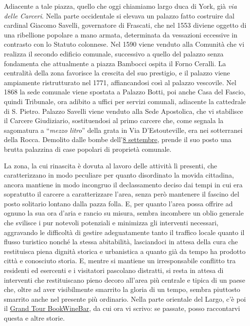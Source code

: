\documentclass[
  letterpaper,
  DIV=11,
  numbers=noendperiod]{scrartcl}
\begin{document}
Adiacente a tale piazza, quello che oggi chiamiamo largo duca di York,
già \emph{via delle Carceri}. Nella parte occidentale si elevava un
palazzo fatto costruire dal cardinal Giacomo Savelli, governatore di
Frascati, che nel 1553 diviene oggetto di una ribellione popolare a mano
armata, determinata da vessazioni eccessive in contrasto con lo Statuto
colonnese. Nel 1590 viene venduto alla Comunità che vi realizza il
secondo edificio comunale, successivo a quello del palazzo senza
fondamenta che attualmente a piazza Bambocci ospita il Forno Ceralli. La
centralità della zona favorisce la crescita del suo prestigio, e il
palazzo viene ampiamente ristrutturato nel 1771, affiancandosi così al
palazzo vescovile. Nel 1868 la sede comunale viene spostata a Palazzo
Botti, poi anche Casa del Fascio, quindi Tribunale, ora adibito a uffici
per servizi comunali, adiacente la cattedrale di S. Pietro. Palazzo
Savelli viene venduto alla Sede Apostolica, che vi stabilisce il Carcere
Giudiziario, sostituendosi al primo carcere che, come segnala la
sagomatura a ``\emph{mezzo litro}'' della grata in Via D'Estouteville,
era nei sotterranei della Rocca. Demolito dalle bombe
dell'\protect\hyperlink{0}{8 settembre}, prende il suo posto una brutta
palazzina di case popolari di proprietà comunale.

La zona, la cui rinascita è dovuta al lavoro delle attività lì presenti,
che caratterizzano in modo peculiare per quanto disordinato la movida
cittadina, ancora mantiene in modo incongruo il declassamento deciso dai
tempi in cui era sopratutto il carcere a caratterizzare l'area, senza
però mantenere il fascino del posto solitario lontano dalla pazza folla.
E, per quanto l'area possa offrire ad ognuno la sua ora d'aria e rancio
su misura, sembra incombere un oblio generale che svilisce i pur
notevoli potenziali e minimizza gli interventi necessari, aggravando le
difficoltà di gestire adeguatamente tanto il traffico locale quanto il
flusso turistico nonché la stessa abitabilità, lasciandoci in attesa
della cura che restituisca piena dignità storica e urbanistica a quanto
già da tempo ha prodotto città e conosciuto storia. E, mentre si
mantiene un irresponsabile conflitto tra residenti ed esercenti e i
visitatori pascolano distratti, si resta in attesa di interventi che
restituiscano pieno decoro all'area più centrale e tipica di un paese
che, oltre ad aver visibilmente smarrito la gloria di un tempo, sembra
piuttosto smarrito anche nel presente più ordinario. Nella parte
orientale del Largo, c'è poi il \protect\hyperlink{0}{Grand Tour
BookWineBar}, da cui ora vi scrivo: se passate, posso raccontarvi questa
e altre storie.
\end{document}
